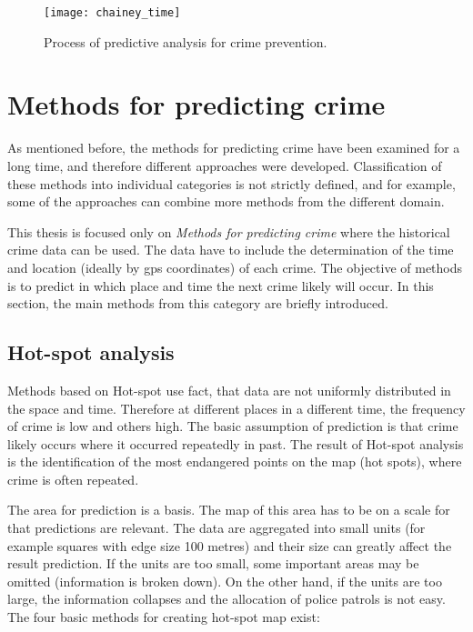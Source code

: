 \documentclass[thesis=M,english]{FITthesis}[2012/10/20]
\begin{document}
\begin{figure}[ht]\centering
    \texttt{[image: chainey\_time]}
    \caption{Process of predictive analysis for crime prevention\cite[39]{Chainey2015maps}.}\label{fig:chainey_time}
\end{figure}

\section{Methods for predicting crime}

As mentioned before, the methods for predicting crime have been examined for a long time, and therefore different approaches were developed. Classification of these methods into individual categories is not strictly defined, and for example, some of the approaches can combine more methods from the different domain.   

This thesis is focused only on \textit{Methods for predicting crime} where the historical crime data can be used. The data have to include the determination of the time and location (ideally by \gls{gps} coordinates) of each crime. The objective of methods is to predict in which place and time the next crime likely will occur. In this section, the main methods from this category are briefly introduced. 

\subsection{Hot-spot analysis}

Methods based on Hot-spot use fact, that data are not uniformly distributed in the space and time. Therefore at different places in a different time, the frequency of crime is low and others high. The basic assumption of prediction is that crime likely occurs where it occurred repeatedly in past. The result of Hot-spot analysis is the identification of the most endangered points on the map (hot spots), where crime is often repeated. \cite[19]{PP13}

The area for prediction is a basis. The map of this area has to be on a scale for that predictions are relevant. The data are aggregated into small units (for example squares with edge size 100 metres) and their size can greatly affect the result prediction. If the units are too small, some important areas may be omitted (information is broken down). On the other hand, if the units are too large, the information collapses and the allocation of police patrols is not easy. The four basic methods for creating hot-spot map exist\cite[19--29]{PP13}:
\end{document}
